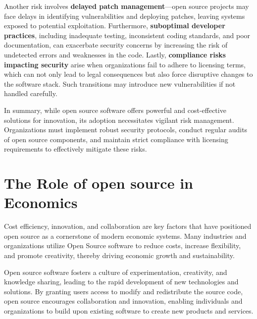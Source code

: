 Another risk involves \textbf{delayed patch management}—open source projects may face delays in identifying vulnerabilities and deploying patches, leaving systems exposed to potential exploitation. Furthermore, \textbf{suboptimal developer practices}, including inadequate testing, inconsistent coding standards, and poor documentation, can exacerbate security concerns by increasing the risk of undetected errors and weaknesses in the code. Lastly, \textbf{compliance risks impacting security} arise when organizations fail to adhere to licensing terms, which can not only lead to legal consequences but also force disruptive changes to the software stack. Such transitions may introduce new vulnerabilities if not handled carefully.

\cite{OpenSource-Software-Risks-ConnectWise}

In summary, while open source software offers powerful and cost-effective solutions for innovation, its adoption necessitates vigilant risk management. Organizations must implement robust security protocols, conduct regular audits of open source components, and maintain strict compliance with licensing requirements to effectively mitigate these risks.

\section{The Role of open source in Economics}

Cost efficiency, innovation, and collaboration are key factors that have positioned open source as a cornerstone of modern economic systems. Many industries and organizations utilize Open Source software to reduce costs, increase flexibility, 
and promote creativity, thereby driving economic growth and sustainability.


Open source software fosters a culture of experimentation, creativity, and knowledge sharing, 
leading to the rapid development of new technologies and solutions. By granting users access to modify and redistribute the source code, 
open source encourages collaboration and innovation, 
enabling individuals and organizations to build upon existing software to create new products and services.

